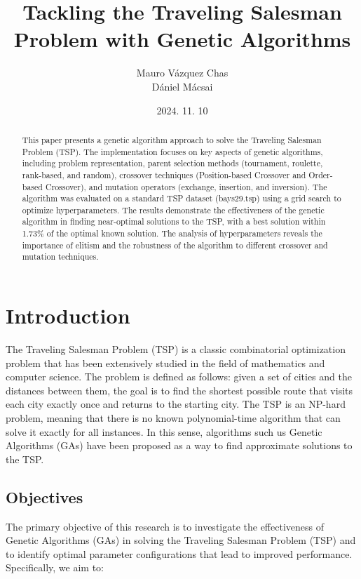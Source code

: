 \documentclass[11pt]{article}
\title{%
    \vspace{2in} %
    \textbf{Tackling the Traveling Salesman Problem with Genetic Algorithms}\\
    \vspace{2in}
}
\author{
    Mauro Vázquez Chas \\
    Dániel Mácsai
    \vspace{0.2in}
}
\date{2024. 11. 10}
\begin{document}
\maketitle
\thispagestyle{empty}

\begin{abstract}
    \noindent
    This paper presents a genetic algorithm approach to solve the Traveling Salesman Problem (TSP). The implementation focuses on key aspects of genetic algorithms, including problem representation, parent selection methods (tournament, roulette, rank-based, and random), crossover techniques (Position-based Crossover and Order-based Crossover), and mutation operators (exchange, insertion, and inversion). The algorithm was evaluated on a standard TSP dataset (bays29.tsp) using a grid search to optimize hyperparameters. The results demonstrate the effectiveness of the genetic algorithm in finding near-optimal solutions to the TSP, with a best solution within 1.73\% of the optimal known solution. The analysis of hyperparameters reveals the importance of elitism and the robustness of the algorithm to different crossover and mutation techniques.
\end{abstract}

\newpage

\tableofcontents
\newpage



\section{Introduction}
The Traveling Salesman Problem (TSP) is a classic combinatorial optimization problem that has been extensively studied in the field of mathematics and computer science. The problem is defined as follows: given a set of cities and the distances between them, the goal is to find the shortest possible route that visits each city exactly once and returns to the starting city. The TSP is an NP-hard problem, meaning that there is no known polynomial-time algorithm that can solve it exactly for all instances. In this sense, algorithms such us Genetic Algorithms (GAs) have been proposed as a way to find approximate solutions to the TSP.

\subsection{Objectives}

The primary objective of this research is to investigate the effectiveness of Genetic Algorithms (GAs) in solving the Traveling Salesman Problem (TSP) and to identify optimal parameter configurations that lead to improved performance. Specifically, we aim to:
\end{document}
